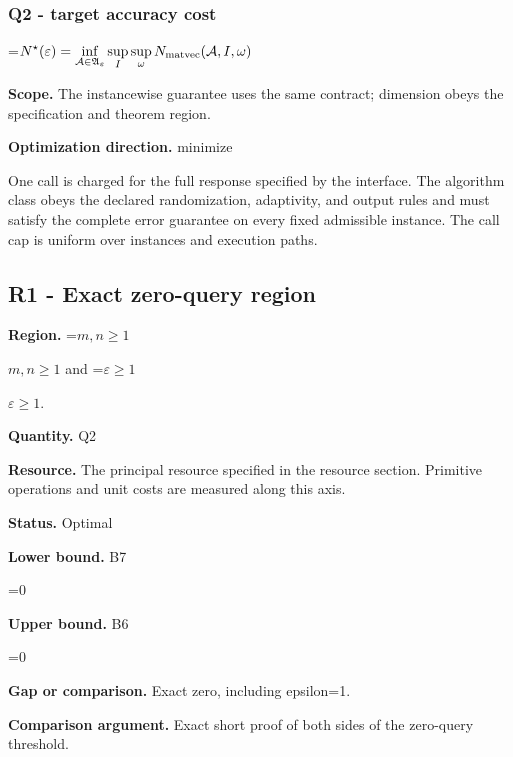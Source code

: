 \documentclass[10pt,a4paper]{article}
\newcommand{\AtlasMath}[1]{\par\begingroup\centering\setbox0=\hbox{$\displaystyle #1$}\ifdim\wd0>1.4\linewidth\typeout{ATLAS WIDE FORMULA: \the\wd0}\fi\ifdim\wd0>\linewidth\resizebox{\linewidth}{!}{\box0}\else\box0\fi\par\endgroup}
\newcommand{\AtlasInlineMath}[1]{\begingroup\setbox0=\hbox{$#1$}\ifdim\wd0>.4\linewidth\endgroup\AtlasMath{#1}\else\endgroup$#1$\fi}
\begin{document}
\subsubsection{Q2 - target accuracy cost}


\AtlasMath{N^\star(\varepsilon)=\inf_{\mathcal A\in\mathfrak A_\varepsilon}\sup_I \sup_\omega N_{\rm matvec}(\mathcal A,I,\omega)}


\textbf{Scope.} The instancewise guarantee uses the same contract; dimension obeys the specification and theorem region.



\textbf{Optimization direction.} minimize



One call is charged for the full response specified by the interface. The algorithm class obeys the declared randomization, adaptivity, and output rules and must satisfy the complete error guarantee on every fixed admissible instance. The call cap is uniform over instances and execution paths.



\subsection{R1 - Exact zero-query region}


\textbf{Region.} \AtlasInlineMath{m,n\ge1} and \AtlasInlineMath{\varepsilon\ge1}.



\textbf{Quantity.} Q2



\textbf{Resource.} The principal resource specified in the resource section. Primitive operations and unit costs are measured along this axis.



\textbf{Status.} Optimal



\textbf{Lower bound.} B7



\AtlasMath{0}


\textbf{Upper bound.} B6



\AtlasMath{0}


\textbf{Gap or comparison.} Exact zero, including epsilon=1.



\textbf{Comparison argument.} Exact short proof of both sides of the zero-query threshold.
\end{document}

